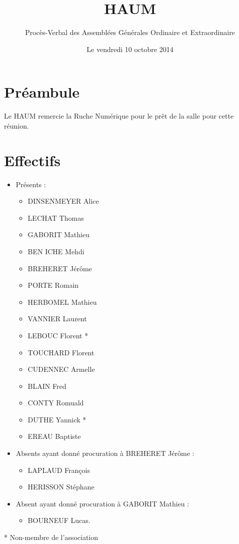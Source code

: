 \documentclass[a4paper, 11pt]{article}
\title{HAUM}
\author{Procès-Verbal des Assemblées Générales Ordinaire et Extraordinaire}
\date{Le vendredi 10 octobre 2014}
\begin{document}
\maketitle

\section*{Préambule}

Le HAUM remercie la Ruche Numérique pour le prêt de la salle pour cette réunion.

\section{Effectifs}

\begin{itemize}
	\item Présents : 
		\begin{itemize}
		  \item DINSENMEYER Alice
		  \item LECHAT Thomas
		  \item GABORIT Mathieu
		  \item BEN ICHE Mehdi
		  \item BREHERET Jérôme
		  \item PORTE Romain
		  \item HERBOMEL Mathieu
		  \item VANNIER Laurent 
		  \item LEBOUC Florent *
		  \item TOUCHARD Florent
		  \item CUDENNEC Armelle
		  \item BLAIN Fred
		  \item CONTY Romuald
		  \item DUTHE Yannick *
		  \item EREAU Baptiste
		\end{itemize}
	\item Absents ayant donné procuration à BREHERET Jérôme :
		\begin{itemize}
			\item LAPLAUD François
			\item HERISSON Stéphane 
		\end{itemize}
	\item Absent ayant donné procuration à GABORIT Mathieu :
		\begin{itemize}
			\item BOURNEUF Lucas.
		\end{itemize}
\end{itemize}
* Non-membre de l'association
\end{document}
